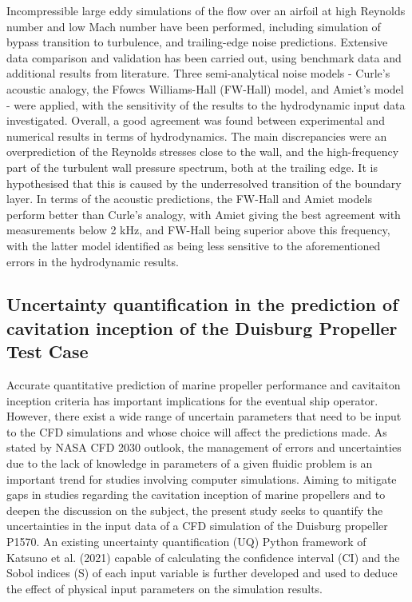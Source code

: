 \documentclass[a4paper,10pt]{article}
\begin{document}
Incompressible large eddy simulations of the flow over an airfoil at high Reynolds number and low Mach number have been performed, including simulation of bypass transition to turbulence, and trailing-edge noise predictions. Extensive data comparison and validation has been carried out, using benchmark data and additional results from literature. Three semi-analytical noise models - Curle's acoustic analogy, the Ffowcs Williams-Hall (FW-Hall) model, and Amiet's model - were applied, with the sensitivity of the results to the hydrodynamic input data investigated. Overall, a good agreement was found between experimental and numerical results in terms of hydrodynamics. The main discrepancies were an overprediction of the Reynolds stresses close to the wall, and the high-frequency part of the turbulent wall pressure spectrum, both at the trailing edge. It is hypothesised that this is caused by the underresolved transition of the boundary layer. In terms of the acoustic predictions, the FW-Hall and Amiet models perform better than Curle’s analogy, with Amiet giving the best agreement with measurements below 2 kHz, and FW-Hall being superior above this frequency, with the latter model identified as being less sensitive to the aforementioned errors in the hydrodynamic results.

\subsection{Uncertainty quantification in the prediction of cavitation inception of the Duisburg Propeller Test Case \cite{scussel_uncertainty_2022}}

Accurate quantitative prediction of marine propeller performance and cavitaiton inception criteria has important implications for the eventual ship operator. However, there exist a wide range of uncertain parameters that need to be input to the CFD simulations and whose choice will affect the predictions made. As stated by NASA CFD 2030 outlook, the management of errors and uncertainties due to the lack of knowledge in parameters of a given fluidic problem is an important trend for studies involving computer simulations. Aiming to mitigate gaps in studies regarding the cavitation inception of marine propellers and to deepen the discussion on the subject, the present study seeks to quantify the uncertainties in the input data of a CFD simulation of the Duisburg propeller P1570. An existing uncertainty quantification (UQ) Python framework of Katsuno et al. (2021) capable of calculating the confidence interval (CI) and the Sobol indices (S) of each input variable is further developed and used to deduce the effect of physical input parameters on the simulation results.
\end{document}
